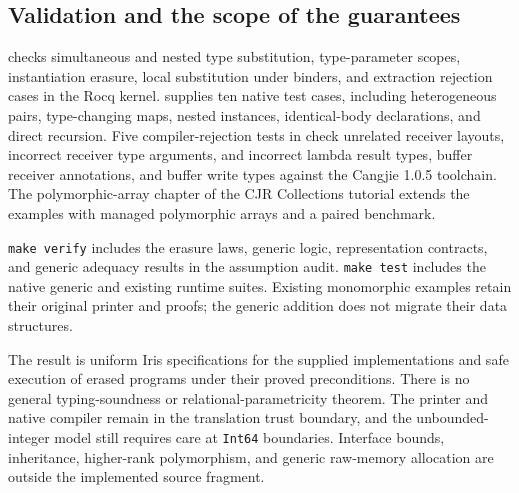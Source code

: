 \subsection{Validation and the scope of the guarantees}

 checks simultaneous and nested
type substitution, type-parameter scopes, instantiation erasure, local
substitution under binders, and extraction rejection cases in the Rocq
kernel.  supplies ten native
test cases, including heterogeneous pairs, type-changing maps, nested
instances, identical-body declarations, and direct recursion. Five
compiler-rejection tests in 
check unrelated receiver layouts, incorrect receiver type arguments, and
incorrect lambda result types, buffer receiver annotations, and buffer
write types against the Cangjie 1.0.5 toolchain. The polymorphic-array chapter of the CJR Collections tutorial
extends the examples with managed polymorphic arrays and a paired benchmark.

\texttt{make verify} includes the erasure laws, generic logic,
representation contracts, and generic adequacy results in the assumption
audit. \texttt{make test} includes the native generic and existing runtime
suites. Existing monomorphic examples retain their original printer and
proofs; the generic addition does not migrate their data structures.

The result is uniform Iris specifications for the supplied implementations
and safe execution of erased programs under their proved preconditions.
There is no general typing-soundness or relational-parametricity theorem.
The printer and native compiler remain in the translation trust boundary,
and the unbounded-integer model still requires care at \texttt{Int64}
boundaries. Interface bounds, inheritance, higher-rank polymorphism, and
generic raw-memory allocation are outside the implemented source fragment.

